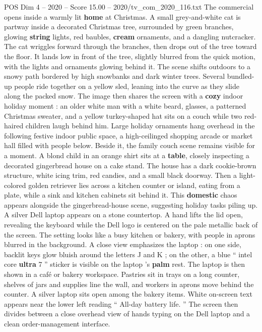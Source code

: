\begin{textsample}{POS Dim 4 – 2020 – Score 15.00 – 2020/tv\_com\_2020\_116.txt}  \label{ex:f4_pos_018}
The commercial opens inside a warmly lit \textbf{home} at Christmas.
A small grey-and-white cat is partway inside a decorated Christmas tree, surrounded by green branches, glowing \textbf{string} lights, red baubles, \textbf{cream} ornaments, and a dangling nutcracker.
The cat wriggles forward through the branches, then drops out of the tree toward the floor.
It lands low in front of the tree, slightly blurred from the quick motion, with the lights and ornaments glowing behind it.
The scene shifts outdoors to a snowy path bordered by high snowbanks and dark winter trees.
Several bundled-up people ride together on a yellow sled, leaning into the curve as they slide along the packed snow.
The image then shares the screen with a \textbf{cozy} indoor holiday moment : an older white man with a white beard, glasses, a patterned Christmas sweater, and a yellow turkey-shaped hat sits on a couch while two red-haired children laugh behind him.
Large holiday ornaments hang overhead in the following festive indoor public space, a high-ceilinged shopping arcade or market hall filled with people below.
Beside it, the family couch scene remains visible for a moment.
A blond child in an orange shirt sits at a \textbf{table}, closely inspecting a decorated gingerbread house on a cake stand.
The house has a dark cookie-brown structure, white icing trim, red candies, and a small black doorway.
Then a light-colored golden retriever lies across a kitchen counter or island, eating from a plate, while a sink and kitchen cabinets sit behind it.
This \textbf{domestic} chaos appears alongside the gingerbread-house scene, suggesting holiday tasks piling up.
A silver Dell laptop appears on a stone countertop.
A hand lifts the lid open, revealing the keyboard while the Dell logo is centered on the pale metallic back of the screen.
The setting looks like a busy kitchen or bakery, with people in aprons blurred in the background.
A close view emphasizes the laptop : on one side, backlit keys glow bluish around the letters J and K ; on the other, a blue “ intel core \textbf{ultra} 7 ” sticker is visible on the laptop ’s \textbf{palm} rest.
The laptop is then shown in a café or bakery workspace.
Pastries sit in trays on a long counter, shelves of jars and supplies line the wall, and workers in aprons move behind the counter.
A silver laptop sits open among the bakery items.
White on-screen text appears near the lower left reading “ All-day battery life. ” The screen then divides between a close overhead view of hands typing on the Dell laptop and a clean order-management interface.

\end{textsample}

